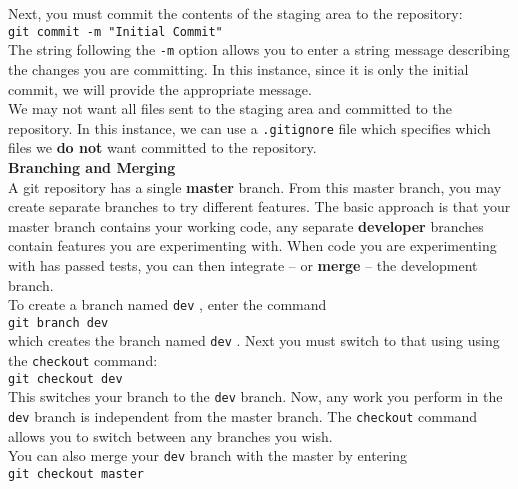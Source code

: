 \documentclass[11pt]{article}
\begin{document}
\noindent
Next, you must commit the contents of the staging area to the repository: \\

{\tt git commit -m "Initial Commit"} \\

\noindent
The string following the {\tt -m} option allows you to enter a string message describing the changes you are committing. In this instance, since it is only the initial commit, we will provide the appropriate message. \\

\noindent
We may not want all files sent to the staging area and committed to the repository. In this instance, we can use a {\tt .gitignore} file which specifies which files we {\bf do not} want committed to the repository. \\

\noindent
{\bf Branching and Merging} \\

\noindent
A git repository has a single {\bf master} branch. From this master branch, you may create separate branches to try different features. The basic approach is that your master branch contains your working code, any separate {\bf developer} branches contain features you are experimenting with. When code you are experimenting with has passed tests, you can then integrate -- or {\bf merge} -- the development branch. \\

\noindent
To create a branch named {\tt dev} , enter the command \\

{\tt git branch dev} \\

\noindent 
which creates the branch named {\tt dev} . Next you must switch to that using using the {\tt checkout}
command: \\

{\tt git checkout dev} \\

\noindent
This switches your branch to the {\tt dev} branch. Now, any work you perform in the {\tt dev} branch is independent from the master branch. The {\tt checkout} command allows you to switch between any branches you wish. \\

\noindent
You can also merge your {\tt dev} branch with the master by entering \\

{\tt git checkout master} 
\end{document}
